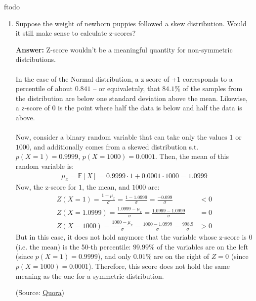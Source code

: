 ƒtodo\documentclass{article}
\newenvironment{QandA}{\begin{enumerate}[label=\arabic*.]}{\end{enumerate}}
\newenvironment{InnerQandA}{\begin{enumerate}[label=\roman*.]}{\end{enumerate}}
\newenvironment{answer}{\par\normalfont \textbf{Answer:}}{}
\newcommand{\Exp}[1]{\mathbb{E}\left[ #1 \right]}
\begin{document}
\begin{QandA}
\begin{InnerQandA}
        \item Suppose the weight of newborn puppies followed a skew distribution. Would it still make sense to calculate z-scores?
        \begin{answer}
            Z-score wouldn't be a  meaningful quantity for non-symmetric distributions. \\\\
            In the case of the Normal distribution, a z score of +1 corresponds to a percentile of about $0.841$ -- or equivaletnly, that $84.1\%$ of the samples from the distribution are below one standard deviation above the mean. Likewise, a z-score of $0$ is the point where half the data is below and half the data is above. \\\\
            Now, consider a binary random variable that can take only the values $1$ or $1000$, and additionally comes from a skewed distribution s.t. $p(X=1) = 0.9999$, $p(X=1000) = 0.0001$. Then, the mean of this random variable is:
            \begin{align*}
                \mu_x = \Exp{X} = 0.9999 \cdot 1 + 0.0001 \cdot 1000 = 1.0999
            \end{align*}
            Now, the z-score for $1$, the mean, and $1000$ are:
            \begin{align*}
                Z(X=1) = \frac{1 - \mu_x}{\sigma} = \frac{1 - 1.0999}{\sigma} = \frac{-0.099}{\sigma} &< 0 \\
                Z(X=1.0999) = \frac{1.0999 - \mu_x}{\sigma} = \frac{1.0999 - 1.0999}{\sigma} &= 0 \\
                Z(X=1000) = \frac{1000 - \mu_x}{\sigma} = \frac{1000 - 1.0999}{\sigma} = \frac{998.9}{\sigma} &> 0
            \end{align*}
            But in this case, it does not hold anymore that the variable whose z-score is 0 (i.e. the mean) is the 50-th percentile: $99.99\%$ of the variables are on the left (since $p(X=1) = 0.9999$), and only $0.01\%$ are on the right of $Z=0$ (since $p(X=1000) = 0.0001$). Therefore, this score does not hold the same meaning as the one for a symmetric distribution.
            
            (Source: \href{https://qr.ae/pvg5Ih}{Quora})
        \end{answer}
    \end{InnerQandA}


\end{QandA}
\end{document}

